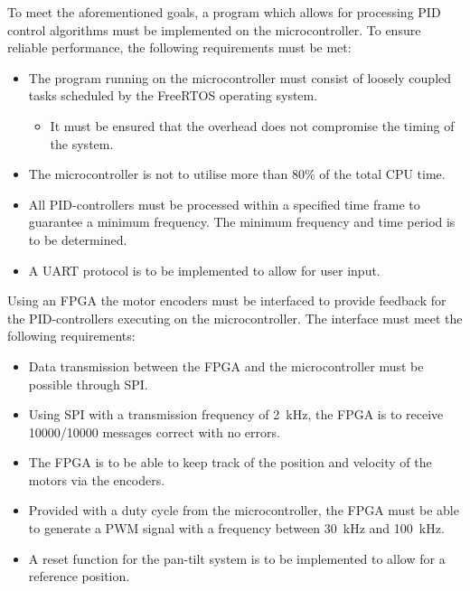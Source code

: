 \documentclass[../../main.tex]{subfiles}
\begin{document}
To meet the aforementioned goals, a program which allows for processing PID control algorithms must be implemented on the microcontroller. To ensure reliable performance, the following requirements must be met:
\begin{itemize}
    \item The program running on the microcontroller must consist of loosely coupled tasks scheduled by the FreeRTOS operating system.
    \begin{itemize}
        \item It must be ensured that the overhead does not compromise the timing of the system.
    \end{itemize}
    \item The microcontroller is not to utilise more than 80\% of the total CPU time.
    \item All PID-controllers must be processed within a specified time frame to guarantee a minimum frequency. The minimum frequency and time period is to be determined.
    \item A UART protocol is to be implemented to allow for user input.
\end{itemize}
Using an FPGA the motor encoders must be interfaced to provide feedback for the PID-controllers executing on the microcontroller. The interface must meet the following requirements:
\begin{itemize}
    \item Data transmission between the FPGA and the microcontroller must be possible through SPI.
    \item Using SPI with a transmission frequency of \SI{2}{\kilo\hertz}, the FPGA is to receive 10000/10000 messages correct with no errors.
    \item The FPGA is to be able to keep track of the position and velocity of the motors via the encoders.
    \item Provided with a duty cycle from the microcontroller, the FPGA must be able to generate a PWM signal with a frequency between \SI{30}{\kilo\hertz} and \SI{100}{\kilo\hertz}.
    \item A reset function for the pan-tilt system is to be implemented to allow for a reference position.
\end{itemize}
\end{document}
